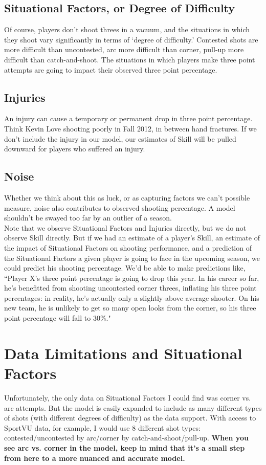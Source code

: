\documentclass[11pt, oneside]{article}   	%
\begin{document}
\subsection{Situational Factors, or Degree of Difficulty}
Of course, players don't shoot threes in a vacuum, and the situations in which they shoot vary significantly in terms of `degree of difficulty.'  Contested shots are more difficult than uncontested, arc more difficult than corner, pull-up more difficult than catch-and-shoot.  The situations in which players make three point attempts are going to impact their observed three point percentage.  
\subsection{Injuries}
An injury can cause a temporary or permanent drop in three point percentage.  Think Kevin Love shooting poorly in Fall 2012, in between hand fractures.   If we don't include the injury in our model, our estimates of Skill will be pulled downward for players who suffered an injury.   
\subsection{Noise}
Whether we think about this as luck, or as capturing factors we can't possible measure, noise also contributes to observed shooting percentage.  A model shouldn't be swayed too far by an outlier of a season.  
\\


Note that we observe Situational Factors and Injuries directly, but we do not observe Skill directly.  But if we had an estimate of a player's Skill, an estimate of the impact of Situational Factors on shooting performance, and a prediction of the Situational Factors a given player is going to face in the upcoming season, we could predict his shooting percentage. We'd be able to make predictions like, ``Player X's three point percentage is going to drop this year. In his career so far, he's benefitted from shooting uncontested corner threes, inflating his three point percentages: in reality, he's actually only a slightly-above average shooter.  On his new team, he is unlikely to get so many open looks from the corner, so his three point percentage will fall to 30\%."

\section{Data Limitations and Situational Factors}
\label{sec:constraints}
Unfortunately, the only data on Situational Factors I could find was corner vs. arc attempts.  But the model is easily expanded to include as many different types of shots (with different degrees of difficulty) as the data support.  With access to SportVU data, for example, I would use 8 different shot types: contested/uncontested by arc/corner by catch-and-shoot/pull-up. \textbf{When you see arc vs. corner in the model, keep in mind that it's a small step from here to a more nuanced and accurate model. }
\end{document}
